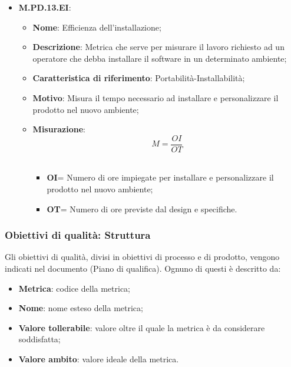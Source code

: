 \documentclass[10pt, a4paper]{article}
\begin{document}
\begin{itemize}
        \item \textbf{M.PD.13.EI}:
    \begin{itemize}
        \item \textbf{Nome}: Efficienza dell'installazione;
        \item \textbf{Descrizione}: Metrica che serve per misurare il lavoro richiesto ad un operatore che debba installare il software in un determinato ambiente;
        \item \textbf{Caratteristica di riferimento}: Portabilità-Installabilità;
        \item \textbf{Motivo}: Misura il tempo necessario ad installare e personalizzare il prodotto nel nuovo ambiente; 
      \item \textbf{Misurazione}:   \[ M=\frac{OI}{OT} \] \\
       \begin{itemize}
           \item \textbf{OI}= Numero di ore impiegate per installare e personalizzare il prodotto nel nuovo ambiente;
           \item \textbf{OT}= Numero di ore previste dal design e specifiche.\\
       \end{itemize}
    \end{itemize}
    
 \end{itemize}

    


   
       

   

    
   
    


\subsubsection{Obiettivi di qualità: Struttura}
Gli obiettivi di qualità, divisi in obiettivi di processo e di prodotto, vengono indicati nel documento (Piano di qualifica). Ognuno di questi è descritto da:
\begin{itemize}
    \item \textbf{Metrica}: codice della metrica;
    \item \textbf{Nome}: nome esteso della metrica;
    \item \textbf{Valore tollerabile}: valore oltre il quale la metrica è da considerare soddisfatta;
    \item \textbf{Valore ambito}: valore ideale della metrica.
\end{itemize}
\end{document}
